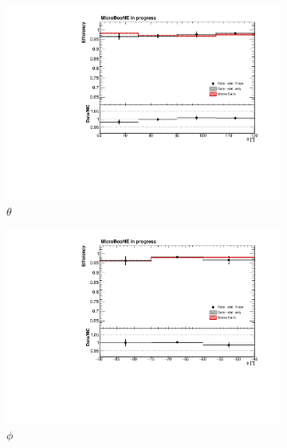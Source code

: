 \documentclass[a4paper]{scrartcl}
\begin{document}
\begin{figure}[htbp]
  \begin{center}
    \begin{subfigure}{0.6\textwidth}
      \includegraphics[width=\linewidth]{figures/theta.pdf}
      \caption{$\theta$} \label{fig:theta}
    \end{subfigure}
    \begin{subfigure}{0.6\textwidth}
      \includegraphics[width=\linewidth]{figures/phi.pdf}
      \caption{$\phi$} \label{fig:phi}
    \end{subfigure}
    \begin{subfigure}{0.6\textwidth}

\end{subfigure}
\end{center}
\end{figure}
\end{document}
